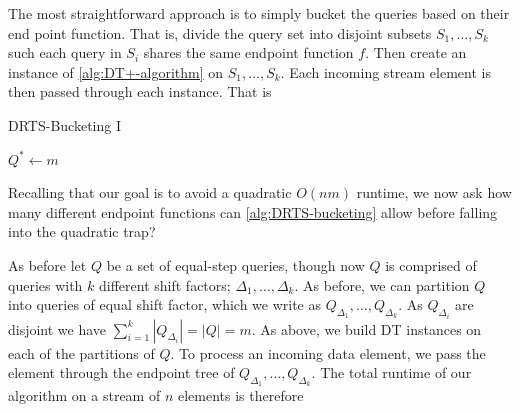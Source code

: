The most straightforward approach is to simply bucket the queries based on their end point function. That is, divide the query set into disjoint subsets $S_1,\dots, S_k$ such each query in $S_i$ shares the same endpoint function $f$. Then create an instance of \cref{alg:DT+-algorithm} on $S_1,\dots,S_k$. Each incoming stream element is then passed through each instance. That is

\begin{algorithm}
\caption{DRTS-Bucketing I}\label{alg:DRTS-bucketing}
\begin{algorithmic}[1]
\Require $Q^* \gets m$ 
\State {}
\State {}
    \State {} 
\EndFor
\end{algorithmic}
\end{algorithm}

Recalling that our goal is to avoid a quadratic $O(nm)$ runtime, we now ask how many different endpoint functions can \cref{alg:DRTS-bucketing} allow before falling into the quadratic trap?  

 As before let $Q$ be a set of equal-step queries, though now $Q$ is comprised of queries with $k$ different shift factors; $\Delta_1, \dots, \Delta_k$. As before, we can partition $Q$ into queries of equal shift factor, which we write as $Q_{\Delta_1}, \dots, Q_{\Delta_k}$. As $Q_{\Delta_i}$ are disjoint we have 
$\sum_{i=1}^{k} |Q_{\Delta_i}| = |Q| = m$. As above, we build DT instances on each of the partitions of $Q$. To process an incoming data element, we pass the element through the endpoint tree of $Q_{\Delta_1},\dots, Q_{\Delta_k}$. The total runtime of our algorithm on a stream of $n$ elements is therefore

